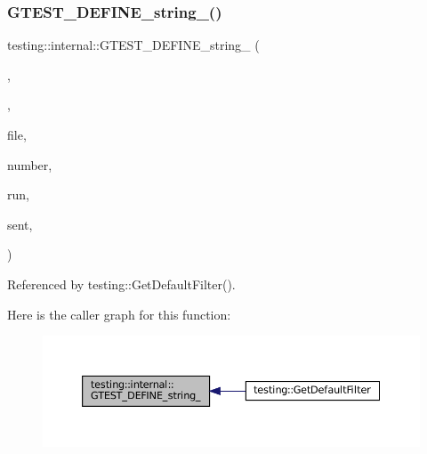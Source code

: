 \subsubsection{\texorpdfstring{G\+T\+E\+S\+T\+\_\+\+D\+E\+F\+I\+N\+E\+\_\+string\+\_\+()}{GTEST\_DEFINE\_string\_()}}
{\footnotesize\ttfamily testing\+::internal\+::\+G\+T\+E\+S\+T\+\_\+\+D\+E\+F\+I\+N\+E\+\_\+string\+\_\+ (\begin{DoxyParamCaption}\item[{internal\+\_\+run\+\_\+death\+\_\+test}]{,  }\item[{\char`\"{}\char`\"{}}]{,  }\item[{\char`\"{}Indicates the}]{file,  }\item[{line}]{number,  }\item[{temporal index of \char`\"{} \char`\"{}the single death test to}]{run,  }\item[{and a file descriptor to \char`\"{} \char`\"{}which a success code may be}]{sent,  }\item[{all separated by \char`\"{} \char`\"{}the \textquotesingle{}$\vert$\textquotesingle{} characters. This flag is specified if and only if the current \char`\"{} \char`\"{}process is a sub-\/process launched for running a thread-\/safe \char`\"{} \char`\"{}death test. F\+OR I\+N\+T\+E\+R\+N\+AL U\+SE O\+N\+L\+Y.\char`\"{}}]{ }\end{DoxyParamCaption})}



Referenced by testing\+::\+Get\+Default\+Filter().

Here is the caller graph for this function\+:
\nopagebreak
\begin{figure}[H]
\begin{center}
\leavevmode
\includegraphics[width=350pt]{namespacetesting_1_1internal_a20bfd9d47d8dd167ffc1c37a4c9ff73e_icgraph}
\end{center}
\end{figure}
\mbox{\label{namespacetesting_1_1internal_aa14e3caa94126d7fb8e06bfb3d24ae4a}} 
